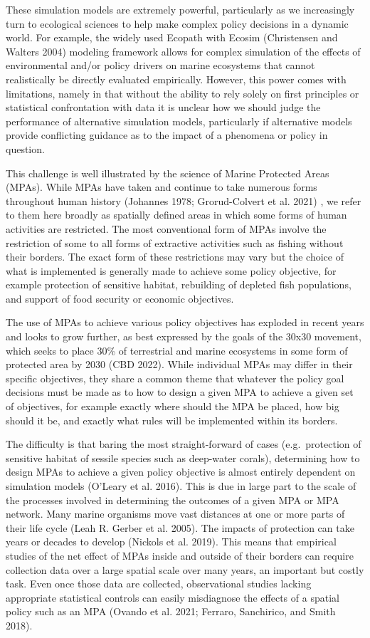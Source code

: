 \documentclass[
  default,
  lineno,
  referee]{sn-jnl}
\begin{document}
These simulation models are extremely powerful, particularly as we
increasingly turn to ecological sciences to help make complex policy
decisions in a dynamic world. For example, the widely used Ecopath with
Ecosim (Christensen and Walters 2004) modeling framework allows for
complex simulation of the effects of environmental and/or policy drivers
on marine ecosystems that cannot realistically be directly evaluated
empirically. However, this power comes with limitations, namely in that
without the ability to rely solely on first principles or statistical
confrontation with data it is unclear how we should judge the
performance of alternative simulation models, particularly if
alternative models provide conflicting guidance as to the impact of a
phenomena or policy in question.

This challenge is well illustrated by the science of Marine Protected
Areas (MPAs). While MPAs have taken and continue to take numerous forms
throughout human history (Johannes 1978; Grorud-Colvert et al. 2021) ,
we refer to them here broadly as spatially defined areas in which some
forms of human activities are restricted. The most conventional form of
MPAs involve the restriction of some to all forms of extractive
activities such as fishing without their borders. The exact form of
these restrictions may vary but the choice of what is implemented is
generally made to achieve some policy objective, for example protection
of sensitive habitat, rebuilding of depleted fish populations, and
support of food security or economic objectives.

The use of MPAs to achieve various policy objectives has exploded in
recent years and looks to grow further, as best expressed by the goals
of the 30x30 movement, which seeks to place 30\% of terrestrial and
marine ecosystems in some form of protected area by 2030 (CBD 2022).
While individual MPAs may differ in their specific objectives, they
share a common theme that whatever the policy goal decisions must be
made as to how to design a given MPA to achieve a given set of
objectives, for example exactly where should the MPA be placed, how big
should it be, and exactly what rules will be implemented within its
borders.

The difficulty is that baring the most straight-forward of cases
(e.g.~protection of sensitive habitat of sessile species such as
deep-water corals), determining how to design MPAs to achieve a given
policy objective is almost entirely dependent on simulation models
(O'Leary et al. 2016). This is due in large part to the scale of the
processes involved in determining the outcomes of a given MPA or MPA
network. Many marine organisms move vast distances at one or more parts
of their life cycle (Leah R. Gerber et al. 2005). The impacts of
protection can take years or decades to develop (Nickols et al. 2019).
This means that empirical studies of the net effect of MPAs inside and
outside of their borders can require collection data over a large
spatial scale over many years, an important but costly task. Even once
those data are collected, observational studies lacking appropriate
statistical controls can easily misdiagnose the effects of a spatial
policy such as an MPA (Ovando et al. 2021; Ferraro, Sanchirico, and
Smith 2018).
\end{document}

